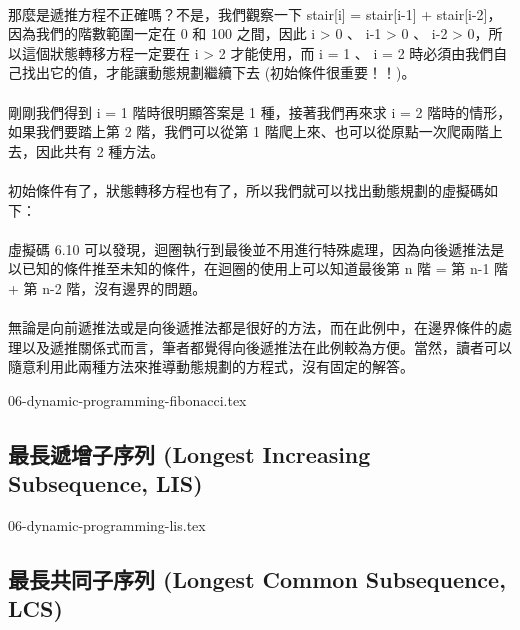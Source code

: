 \documentclass[12pt,a4paper,oneside]{report}
\begin{document}
\begin{CJK}{UTF8}{bkai}
\paragraph{}那麼是遞推方程不正確嗎？不是，我們觀察一下 stair[i] = stair[i-1] + stair[i-2]，因為我們的階數範圍一定在 0 和 100 之間，因此 i > 0 、 i-1 > 0 、 i-2 > 0，所以這個狀態轉移方程一定要在 i > 2 才能使用，而 i = 1 、 i = 2 時必須由我們自己找出它的值，才能讓動態規劃繼續下去 (初始條件很重要！！)。

\paragraph{}剛剛我們得到 i = 1 階時很明顯答案是 1 種，接著我們再來求 i = 2 階時的情形，如果我們要踏上第 2 階，我們可以從第 1 階爬上來、也可以從原點一次爬兩階上去，因此共有 2 種方法。

\paragraph{}初始條件有了，狀態轉移方程也有了，所以我們就可以找出動態規劃的虛擬碼如下：

\paragraph{}虛擬碼 6.10 可以發現，迴圈執行到最後並不用進行特殊處理，因為向後遞推法是以已知的條件推至未知的條件，在迴圈的使用上可以知道最後第 n 階 = 第 n-1 階 + 第 n-2 階，沒有邊界的問題。

\paragraph{}無論是向前遞推法或是向後遞推法都是很好的方法，而在此例中，在邊界條件的處理以及遞推關係式而言，筆者都覺得向後遞推法在此例較為方便。當然，讀者可以隨意利用此兩種方法來推導動態規劃的方程式，沒有固定的解答。

{06-dynamic-programming-fibonacci.tex}

\subsection{最長遞增子序列 (Longest Increasing Subsequence, LIS)}

{06-dynamic-programming-lis.tex}

\subsection{最長共同子序列 (Longest Common Subsequence, LCS)}


\end{CJK}
\end{document}
